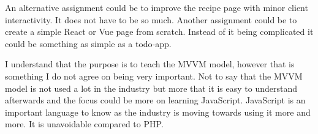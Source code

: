 \documentclass[a4paper]{scrartcl}
\begin{document}
An alternative assignment could be to improve the recipe page with minor client interactivity. It does not have to be so much. Another assignment could be to create a simple React or Vue page from scratch. Instead of it being complicated it could be something as simple as a todo-app.

I understand that the purpose is to teach the MVVM model, however that is something I do not agree on being very important. Not to say that the MVVM model is not used a lot in the industry but more that it is easy to understand afterwards and the focus could be more on learning JavaScript. JavaScript is an important language to know as the industry is moving towards using it more and more. It is unavoidable compared to PHP.
\end{document}
